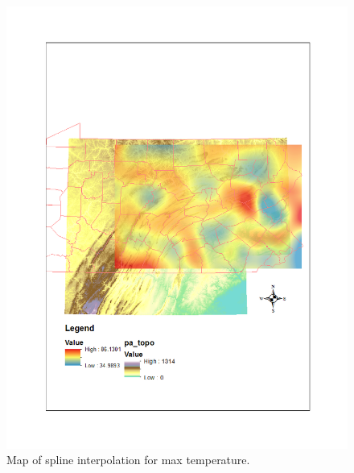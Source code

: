 \documentclass{article}\usepackage[]{graphicx}\usepackage[]{color}
\begin{document}
\begin{figure}
\includegraphics[scale=.9]{./figure/Spline_tmax}
\caption{Map of spline interpolation for max temperature.}
\label{smax}
\end{figure}
\end{document}
